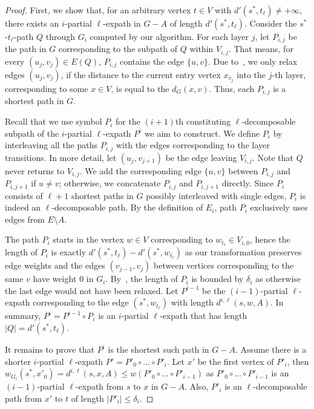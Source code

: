 \documentclass{theoretics}
\newcommand*{\length}[1]{|#1|}
\renewcommand{\le}{\leqslant}
\begin{document}
\begin{proof}
First, we show that, for an arbitrary vertex $t \in V$ with $d'(s^*,t_\ell) \neq +\infty$,
there exists an $i$-partial $\ell$-expath in $G-A$ of length $d'(s^*,t_\ell)$.
Consider the $s^*$-$t_\ell$-path $Q$ through $G_i$ computed by our algorithm.
For each layer $j$, let $P_{i,j}$ be the path in $G$ corresponding 
to the subpath of $Q$ within $V_{i,j}$. 
That means, for every $(u_j, v_j) \in E(Q)$, $P_{i,j}$ contains the edge $\{u, v\}$.
Due to~, we only relax edges $(u_j, v_j)$,
if the distance to the current entry vertex $x_{v_j}$ into the $j$-th layer,
corresponding to some $x \in V$, is equal to the $d_G(x,v)$.
Thus, each $P_{i,j}$ is a shortest path in $G$.

Recall that we use symbol $P_i$ for the $(i{+}1)$th constituting $\ell$-de\-com\-pos\-able subpath of 
the $i$-partial $\ell$-expath $P^{i}$ we aim to construct. 
We define $P_i$ by interleaving all the paths $P_{i,j}$ 
with the edges corresponding to the layer transitions. 
In more detail, let $(u_j,v_{j+1})$ be the edge leaving $V_{i,j}$.
Note that $Q$ never returns to $V_{i,j}$.
We add the corresponding edge $\{u,v\}$ between $P_{i,j}$ and $P_{i,j+1}$ if $u \neq v$;
otherwise, we concatenate $P_{i,j}$ and $P_{i,j+1}$ directly.
Since $P_i$ consists of $\ell+1$ shortest paths in $G$ possibly interleaved with single edges,
$P_i$ is indeed an $\ell$-decomposable path.
By the definition of $E_i$, path $P_i$ exclusively uses edges from $E{\setminus}A$.

The path $P_i$ starts in the vertex $w \in V$ corresponding to $w_{t_\ell} \in V_{i,0}$, 
hence the length of $P_i$ is exactly $d'(s^*, t_\ell) - d'(s^*, w_{t_\ell})$
as our transformation preserves edge weights
and the edges $(v_{j-1},v_j)$ between vertices corresponding to the same $v$ have weight $0$ in $G_i$. 
By~, the length of $P_i$ is bounded by $\delta_i$
as otherwise the last edge would not have been relaxed.
Let $P^{i-1}$ be the $(i{-}1)$-partial $\ell$-expath corresponding to the edge $(s^*, w_{t_\ell})$
with length $d^{i,\ell}(s,w,A)$.
In summary, $P^{i} = P^{i-1} \circ P_i$ is an $i$-partial $\ell$-expath
that has length $\length{Q} = d'(s^*, t_\ell)$.

It remains to prove that $P^{i}$ is the shortest such path in $G - A$.
Assume there is a shorter $i$-partial $\ell$-expath $P' = P'_0 \circ \ldots \circ P'_i$.
Let $x'$ be the first vertex of $P'_i$, then $w_{G_i}(s^*, x'_0) = d^{i,\ell}(s,x,A) \le w( P'_0 \circ \ldots \circ P'_{i-1})$ as $P'_0 \circ \ldots \circ P'_{i-1}$ is an $(i{-}1)$-partial $\ell$-expath
from $s$ to $x$ in $G-A$.
Also, $P'_i$ is an $\ell$-decomposable path from $x'$ to $t$ of length $\length{P'_i} \le \delta_i$.


\end{proof}
\end{document}

